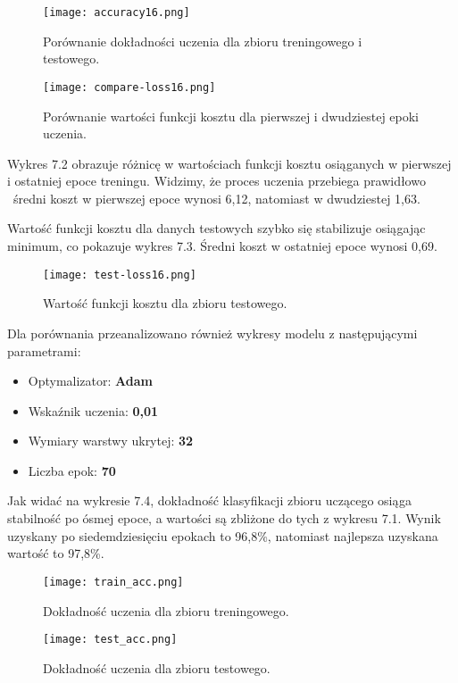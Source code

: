  \label{sec:etykiety}
\begin{figure}[H]
    \centering
    \texttt{[image: accuracy16.png]}
    \caption{Porównanie dokładności uczenia dla zbioru treningowego i testowego.}
\end{figure}


 \label{sec:etykiety}
\begin{figure}[H]
    \centering
    \texttt{[image: compare-loss16.png]}
    \caption{Porównanie wartości funkcji kosztu dla pierwszej i dwudziestej epoki uczenia.}
\end{figure}

Wykres 7.2 obrazuje różnicę w wartościach funkcji kosztu osiąganych w pierwszej i ostatniej epoce treningu. Widzimy, że proces uczenia przebiega prawidłowo \textendash \ średni koszt w pierwszej epoce wynosi 6,12, natomiast w dwudziestej 1,63. 

Wartość funkcji kosztu dla danych testowych szybko się stabilizuje osiągając minimum, co pokazuje wykres 7.3. Średni koszt w ostatniej epoce wynosi 0,69. 

 \label{sec:etykiety}
\begin{figure}[H]
    \centering
    \texttt{[image: test-loss16.png]}
    \caption{Wartość funkcji kosztu dla zbioru testowego.}
\end{figure}

Dla porównania przeanalizowano również wykresy modelu z następującymi parametrami:
\begin{itemize}
  \item Optymalizator: \textbf{Adam}
  \item Wskaźnik uczenia: \textbf{0,01}
  \item Wymiary warstwy ukrytej: \textbf{32}
  \item Liczba epok: \textbf{70}
 \end{itemize}
 
 Jak widać na wykresie 7.4, dokładność klasyfikacji zbioru uczącego osiąga stabilność po ósmej epoce, a wartości są zbliżone do tych z wykresu 7.1. Wynik uzyskany po siedemdziesięciu epokach to 96,8\%, natomiast najlepsza uzyskana wartość to 97,8\%. 
 
  \label{sec:etykiety}
\begin{figure}[H]
    \centering
    \texttt{[image: train\_acc.png]}
    \caption{Dokładność uczenia dla zbioru treningowego.}
\end{figure}

 \label{sec:etykiety}
\begin{figure}[H]
    \centering
    \texttt{[image: test\_acc.png]}
    \caption{Dokładność uczenia dla zbioru testowego.}
\end{figure}

